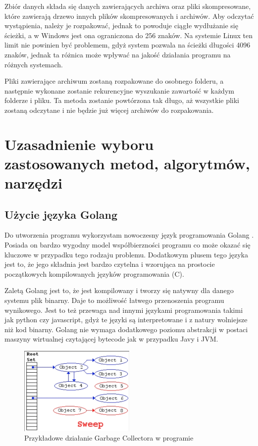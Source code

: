 Zbiór danych składa się danych zawierających archiwa oraz pliki skompresowane,
które zawierają drzewo innych plików skompresowanych i archiwów.
Aby odczytać wystąpienia, należy je rozpakować, jednak to powoduje ciągłe 
wydłużanie się ścieżki, a w Windows jest ona ograniczona do 256 znaków. Na 
systemie Linux ten limit nie powinien być problemem, gdyż system pozwala na 
ścieżki długości 4096 znaków, jednak ta różnica może wpływać na jakość działania
programu na różnych systemach.

Pliki zawierające archiwum zostaną rozpakowane do osobnego folderu, a następnie
wykonane zostanie rekurencyjne wyszukanie zawartość w każdym folderze i pliku.
Ta metoda zostanie powtórzona tak długo, aż wszystkie pliki zostaną odczytane 
i nie będzie już więcej archiwów do rozpakowania.

\section{Uzasadnienie wyboru zastosowanych metod, algorytmów, narzędzi}

\subsection{Użycie języka Golang}

Do utworzenia programu wykorzystam nowoczesny język programowania Golang \cite{bib:internet:golang}.
Posiada on bardzo wygodny model współbierzności programu co może okazać się 
kluczowe w przypadku tego rodzaju problemu. Dodatkowym plusem tego języka jest
to, że jego składnia jest bardzo czytelna i wzorująca na prostocie początkowych
kompilowanych języków programowania (C).

Zaletą Golang jest to, że jest kompilowany i tworzy się natywny dla danego 
systemu plik binarny. Daje to możliwość łatwego przenoszenia programu wynikowego.
Jest to też przewaga nad innymi językami programowania takimi jak python czy
javascript, gdyż te języki są interpretowane i z natury wolniejsze niż kod 
binarny. Golang nie wymaga dodatkowego poziomu abstrakcji w postaci maszyny 
wirtualnej czytającej bytecode jak w przypadku Javy i JVM.

\begin{figure}[h]
\centering
\includegraphics[width=0.5\textwidth]{./images/GarbageCollector.png}
\caption{Przykładowe działanie Garbage Collectora w programie}
\label{fig:GarbageCollectorImage}
\end{figure}

